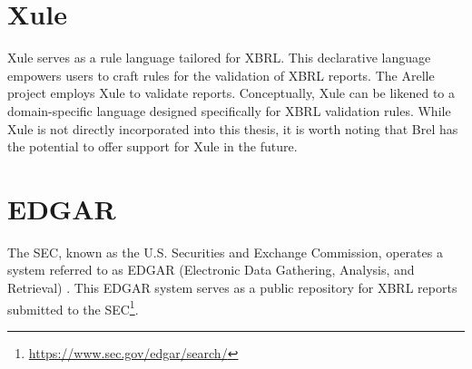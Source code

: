 \section{Xule}
Xule\cite{xule} serves as a rule language tailored for XBRL. 
This declarative language empowers users to craft rules for the validation of XBRL reports. 
The Arelle project employs Xule to validate reports. 
Conceptually, Xule can be likened to a domain-specific language designed specifically for XBRL validation rules. 
While Xule is not directly incorporated into this thesis, it is worth noting that Brel has the potential to offer support for Xule in the future.


\section{EDGAR}
\label{sec:edgar}
The SEC, known as the U.S. Securities and Exchange Commission, 
operates a system referred to as EDGAR (Electronic Data Gathering, Analysis, and Retrieval) \cite{sec_edgar}. 
This EDGAR system serves as a public repository for XBRL reports submitted to the SEC\footnote{\url{https://www.sec.gov/edgar/search/}}.

